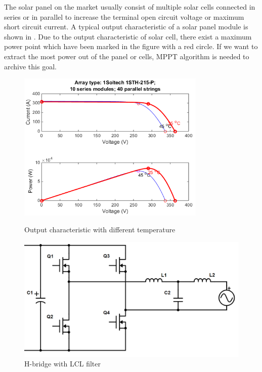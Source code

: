 The solar panel on the market usually consist of multiple solar cells connected in series or in parallel to increase the terminal open circuit voltage or maximum short circuit current. A typical output characteristic of a solar panel module is shown in . Due to the output characteristic of solar cell, there exist a maximum power point which have been marked in the figure with a red circle. If we want to extract the most power out of the panel or cells, \gls{MPPT} algorithm is needed to archive this goal.
\begin{figure}[t]
    \begin{minipage}{.5\textwidth}
            \centering
            \includegraphics[width = 0.8\textwidth]{figures/typical_solar_temp.png}
            \caption{Output characteristic with different temperature}
            \label{fig:typical solar module_temp}
    \end{minipage}
    \begin{minipage}{.5\textwidth}
        \centering
        \includegraphics[width = 1\textwidth]{figures/topology.png}
        \caption{H-bridge with LCL filter}
        \label{fig:topology}
    \end{minipage}
\end{figure}

